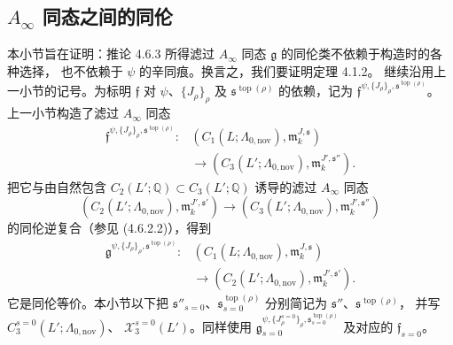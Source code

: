 
\subsection{$A_\infty$ 同态之间的同伦}
\label{subsec:4-6-2}

本小节旨在证明：推论 4.6.3 所得滤过 $A_\infty$ 同态
$\mathfrak g$ 的同伦类不依赖于构造时的各种选择，
也不依赖于 $\psi$ 的辛同痕。换言之，我们要证明定理 4.1.2。
继续沿用上一小节的记号。为标明
$\mathfrak f$ 对 $\psi$、$\{J_\rho\}_\rho$
及 $\mathfrak s^{\operatorname{top}(\rho)}$ 的依赖，记为
$\mathfrak f^{\psi,\{J_\rho\}_\rho,
\mathfrak s^{\operatorname{top}(\rho)}}$。
上一小节构造了滤过 $A_\infty$ 同态
\begin{equation}
\begin{aligned}
\mathfrak f^{\psi,\{J_\rho\}_\rho,
\mathfrak s^{\operatorname{top}(\rho)}}\colon
&(C_1(L;\Lambda_{0,\mathrm{nov}}),
  \mathfrak m_k^{J,\mathfrak s})\\
&\longrightarrow
(C_3(L';\Lambda_{0,\mathrm{nov}}),
  \mathfrak m_k^{J',\mathfrak s''}).
\end{aligned}
\tag{4.6.21}\label{eq:4-6-21}
\end{equation}
把它与由自然包含 $C_2(L';\mathbb Q)\subset C_3(L';\mathbb Q)$
诱导的滤过 $A_\infty$ 同态
\[
(C_2(L';\Lambda_{0,\mathrm{nov}}),
 \mathfrak m_k^{J',\mathfrak s'})
\longrightarrow
(C_3(L';\Lambda_{0,\mathrm{nov}}),
 \mathfrak m_k^{J',\mathfrak s''})
\]
的同伦逆复合（参见 (4.6.2.2)），得到
\begin{equation}
\begin{aligned}
\mathfrak g^{\psi,\{J_\rho\}_\rho,
\mathfrak s^{\operatorname{top}(\rho)}}\colon
&(C_1(L;\Lambda_{0,\mathrm{nov}}),
  \mathfrak m_k^{J,\mathfrak s})\\
&\longrightarrow
(C_2(L';\Lambda_{0,\mathrm{nov}}),
  \mathfrak m_k^{J',\mathfrak s'}).
\end{aligned}
\tag{4.6.22}\label{eq:4-6-22}
\end{equation}
它是同伦等价。本小节以下把
$\mathfrak s''_{s=0}$、$\mathfrak s^{\operatorname{top}(\rho)}_{s=0}$
分别简记为 $\mathfrak s''$、$\mathfrak s^{\operatorname{top}(\rho)}$，
并写 $C_3^{s=0}(L';\Lambda_{0,\mathrm{nov}})$、
$\mathcal X_3^{s=0}(L')$。同样使用
$\mathfrak g_{s=0}^{\psi,\{J_\rho^{s=0}\}_\rho,
\mathfrak s^{\operatorname{top}(\rho)}_{s=0}}$
及对应的 $\mathfrak f_{s=0}$。

